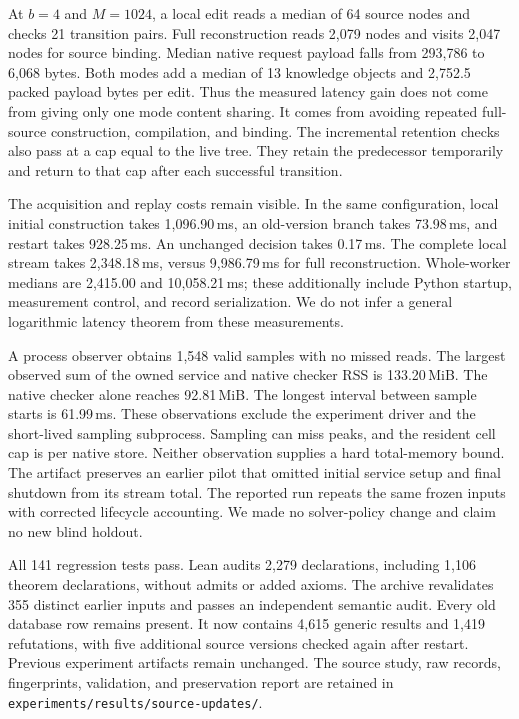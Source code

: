 \documentclass[11pt,a4paper]{article}
\numberwithin{equation}{section}
\theoremstyle{plain}
\theoremstyle{definition}
\theoremstyle{remark}
\begin{document}
At $b=4$ and $M=1024$, a local edit reads a median of 64 source nodes and checks 21 transition pairs. Full reconstruction reads 2,079 nodes and visits 2,047 nodes for source binding. Median native request payload falls from 293,786 to 6,068 bytes. Both modes add a median of 13 knowledge objects and 2,752.5 packed payload bytes per edit. Thus the measured latency gain does not come from giving only one mode content sharing. It comes from avoiding repeated full-source construction, compilation, and binding. The incremental retention checks also pass at a cap equal to the live tree. They retain the predecessor temporarily and return to that cap after each successful transition.

The acquisition and replay costs remain visible. In the same configuration, local initial construction takes 1,096.90\,ms, an old-version branch takes 73.98\,ms, and restart takes 928.25\,ms. An unchanged decision takes 0.17\,ms. The complete local stream takes 2,348.18\,ms, versus 9,986.79\,ms for full reconstruction. Whole-worker medians are 2,415.00 and 10,058.21\,ms; these additionally include Python startup, measurement control, and record serialization. We do not infer a general logarithmic latency theorem from these measurements.

A process observer obtains 1,548 valid samples with no missed reads. The largest observed sum of the owned service and native checker RSS is 133.20\,MiB. The native checker alone reaches 92.81\,MiB. The longest interval between sample starts is 61.99\,ms. These observations exclude the experiment driver and the short-lived sampling subprocess. Sampling can miss peaks, and the resident cell cap is per native store. Neither observation supplies a hard total-memory bound. The artifact preserves an earlier pilot that omitted initial service setup and final shutdown from its stream total. The reported run repeats the same frozen inputs with corrected lifecycle accounting. We made no solver-policy change and claim no new blind holdout.

All 141 regression tests pass. Lean audits 2,279 declarations, including 1,106 theorem declarations, without admits or added axioms. The archive revalidates 355 distinct earlier inputs and passes an independent semantic audit. Every old database row remains present. It now contains 4,615 generic results and 1,419 refutations, with five additional source versions checked again after restart. Previous experiment artifacts remain unchanged. The source study, raw records, fingerprints, validation, and preservation report are retained in \texttt{experiments/results/source-updates/}.
\end{document}
